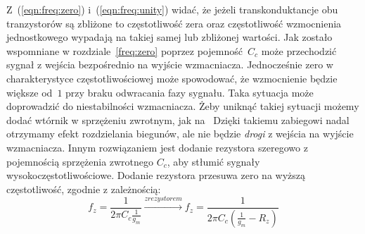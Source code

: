 \documentclass[twoside,pl,final]{labman}
\begin{document}
Z~(\ref{eqn:freq:zero}) i~(\ref{eqn:freq:unity}) widać,
że jeżeli transkonduktancje obu tranzystorów są zbliżone to
częstotliwość zera oraz częstotliwość wzmocnienia jednostkowego
wypadają na takiej samej lub zbliżonej wartości.
Jak zostało wspomniane w rozdziale~\ref{freq:zero}
poprzez pojemność~$C_c$ może przechodzić sygnał z wejścia
bezpośrednio na wyjście wzmacniacza.
Jednocześnie zero w charakterystyce częstotliwościowej może spowodować,
że wzmocnienie będzie większe od~$1$ przy braku odwracania fazy sygnału.
Taka sytuacja może doprowadzić do niestabilności wzmacniacza.
Żeby uniknąć takiej sytuacji możemy dodać wtórnik w sprzężeniu zwrotnym,
jak na~
Dzięki takiemu zabiegowi nadal otrzymamy efekt rozdzielania biegunów,
ale nie będzie \emph{drogi} z wejścia na wyjście wzmacniacza.
Innym rozwiązaniem jest dodanie rezystora szeregowo z pojemnością sprzężenia
zwrotnego $C_c$, aby stłumić sygnały wysokoczęstotliwościowe.
Dodanie rezystora przesuwa zero na wyższą częstotliwość,
zgodnie z zależnością:
\begin{equation}
  f_z = \frac{1}{2 \pi C_c \frac{1}{g_m}} \xrightarrow{z rezystorem}
  f_z = \frac{1}{2 \pi C_c (\frac{1}{g_m} - R_z)}
\end{equation}



\end{document}

